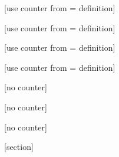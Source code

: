 
[use counter from = definition]%

[use counter from = definition]%

[use counter from = definition]%

[use counter from = definition]%


[no counter]

[no counter]

[no counter]

[section]
\setcounter{exer}{0}
\renewcommand{\theexer}{\thesection.\arabic{exer}}

\newenvironment{exercise}[1][]{
  \refstepcounter{exer}
  \par\noindent\makebox[-3pt][r]{
    \footnotesize\color{red!90}\HandPencilLeft\quad}
    \comicneueangular
    \textbf{\color{blue!90}{\exercisename} \theexer ~~ #1}}{
    \par\ignorespacesafterend}
